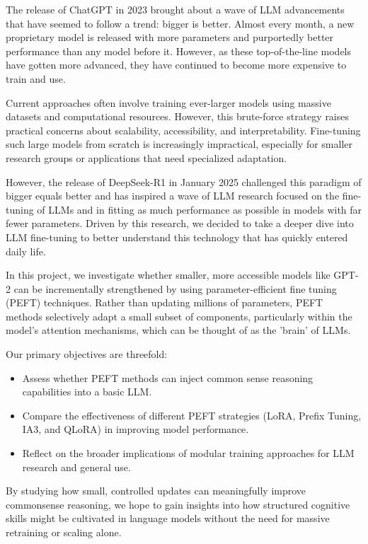 \documentclass[11pt,twocolumn]{article}
\begin{document}
The release of ChatGPT in 2023 brought about a wave of LLM advancements that have seemed to follow a trend: bigger is better. Almost every month, a new proprietary model is released with more parameters and purportedly better performance than any model before it. However, as these top-of-the-line models have gotten more advanced, they have continued to become more expensive to train and use. 

Current approaches often involve training ever-larger models using massive datasets and computational resources. However, this brute-force strategy raises practical concerns about scalability, accessibility, and interpretability. Fine-tuning such large models from scratch is increasingly impractical, especially for smaller research groups or applications that need specialized adaptation.

However, the release of DeepSeek-R1 in January 2025 challenged this paradigm of bigger equals better and has inspired a wave of LLM research focused on the fine-tuning of LLMs and in fitting as much performance as possible in models with far fewer parameters. Driven by this research, we decided to take a deeper dive into LLM fine-tuning to better understand this technology that has quickly entered daily life.

In this project, we investigate whether smaller, more accessible models like GPT-2 can be incrementally strengthened by using parameter-efficient fine tuning (PEFT) techniques. Rather than updating millions of parameters, PEFT methods selectively adapt a small subset of components, particularly within the model's attention mechanisms, which can be thought of as the 'brain' of LLMs.

Our primary objectives are threefold:
\begin{itemize}
    \item Assess whether PEFT methods can inject common sense reasoning capabilities into a basic LLM.
    \item Compare the effectiveness of different PEFT strategies (LoRA, Prefix Tuning, IA3, and QLoRA) in improving model performance.
    \item Reflect on the broader implications of modular training approaches for LLM research and general use.
\end{itemize}

By studying how small, controlled updates can meaningfully improve commonsense reasoning, we hope to gain insights into how structured cognitive skills might be cultivated in language models without the need for massive retraining or scaling alone.
\end{document}
